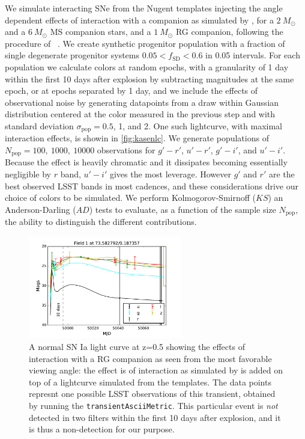 We simulate interacting SNe from the Nugent templates \citep{Nugent02}
injecting the angle dependent effects of interaction with a companion
as simulated by \citep{Kasen10}, for a $2~M_\odot$ and a $6~M_\odot$
MS companion stars, and a $1~M_\odot$ RG companion, following the
procedure of ~\citep{Bianco11}. We create synthetic progenitor
population with a fraction of single degenerate progenitor systems
$0.05 < f_\mathrm{SD} < 0.6 $ in 0.05 intervals. For each population
we calculate colors at random epochs, with a granularity of 1 day
within the first 10 days after explosion by subtracting magnitudes at
the same epoch, or at epochs separated by 1 day, and we include the
effects of observational noise by generating datapoints from a draw
within Gaussian distribution centered at the color measured in the
previous step and with standard deviation $\sigma_\mathrm{pop} = 0.5$,
1, and 2. One such lightcurve, with maximal interaction effects, is showin in \autoref{fig:kasenlc}.
We generate populations of $N_\mathrm{pop}=100,
~1000,~10000$ observations for $g'-r'$, $u'-r'$, $g'-i'$, and
$u'-i'$. Because the effect is heavily chromatic and it dissipates
becoming essentially negligible by $r$ band, $u'-i'$ gives the most
leverage. However $g'$ and $r'$ are the best observed LSST bands in
most cadences, and these considerations drive our choice of colors to
be simulated. We perform Kolmogorov-Smirnoff ($KS$) an
Anderson-Darling ($AD$) tests to evaluate, as a function of the sample
size $N_\mathrm{pop}$, the ability to distinguish the different
contributions.

\begin{figure}[hbt]
\centering\includegraphics[width=0.6\textwidth]{figs/transients/LSST_Kasen_lcv0.pdf}
\caption{
A normal SN Ia light curve at z=0.5 showing the effects of interaction
with a RG companion as seen from the most favorable viewing angle: the
effect is of interaction as simulated by \citet{Kasen10} is added on top
of a lightcurve simulated from the \citealt{Nugent02} templates. The
data points represnt one possible LSST observations of this transient,
obtained by running the \texttt{transientAsciiMetric}. This particular
event is \emph{not} detected in two filters within the first 10 days
after explosion, and it is thus a non-detection for our purpose.}
\label{fig:kasenlc}
\end{figure}



